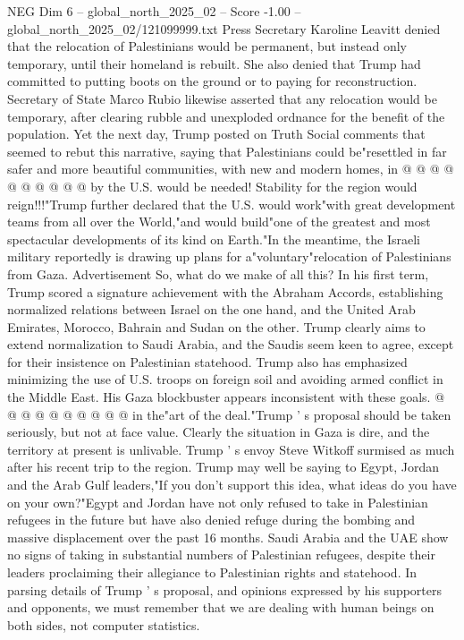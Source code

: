 \begin{textsample}{NEG Dim 6 – global\_north\_2025\_02 – Score -1.00 – global\_north\_2025\_02/121099999.txt}
Press Secretary Karoline Leavitt denied that the relocation of Palestinians would be permanent, but instead only temporary, until their homeland is rebuilt.
She also denied that Trump had committed to putting boots on the ground or to paying for reconstruction.
Secretary of State Marco Rubio likewise asserted that any relocation would be temporary, after clearing rubble and unexploded ordnance for the benefit of the population.
Yet the next day, Trump posted on Truth Social comments that seemed to rebut this narrative, saying that Palestinians could be"resettled in far safer and more beautiful communities, with new and modern homes, in @ @ @ @ @ @ @ @ @ @ by the U.S. would be needed!
Stability for the region would reign!!!"Trump further declared that the U.S. would work"with great development teams from all over the World,"and would build"one of the greatest and most spectacular developments of its kind on Earth."In the meantime, the Israeli military reportedly is drawing up plans for a"voluntary"relocation of Palestinians from Gaza.
Advertisement So, what do we make of all this?
In his first term, Trump scored a signature achievement with the Abraham Accords, establishing normalized relations between Israel on the one hand, and the United Arab Emirates, Morocco, Bahrain and Sudan on the other.
Trump clearly aims to extend normalization to Saudi Arabia, and the Saudis seem keen to agree, except for their insistence on Palestinian statehood.
Trump also has emphasized minimizing the use of U.S. troops on foreign soil and avoiding armed conflict in the Middle East.
His Gaza blockbuster appears inconsistent with these goals. @ @ @ @ @ @ @ @ @ @ in the"art of the deal."Trump ' s proposal should be taken seriously, but not at face value.
Clearly the situation in Gaza is dire, and the territory at present is unlivable.
Trump ' s envoy Steve Witkoff surmised as much after his recent trip to the region.
Trump may well be saying to Egypt, Jordan and the Arab Gulf leaders,"If you don't support this idea, what ideas do you have on your own?"Egypt and Jordan have not only refused to take in Palestinian refugees in the future but have also denied refuge during the bombing and massive displacement over the past 16 months.
Saudi Arabia and the UAE show no signs of taking in substantial numbers of Palestinian refugees, despite their leaders proclaiming their allegiance to Palestinian rights and statehood.
In parsing details of Trump ' s proposal, and opinions expressed by his supporters and opponents, we must remember that we are dealing with human beings on both sides, not computer statistics.

\end{textsample}
